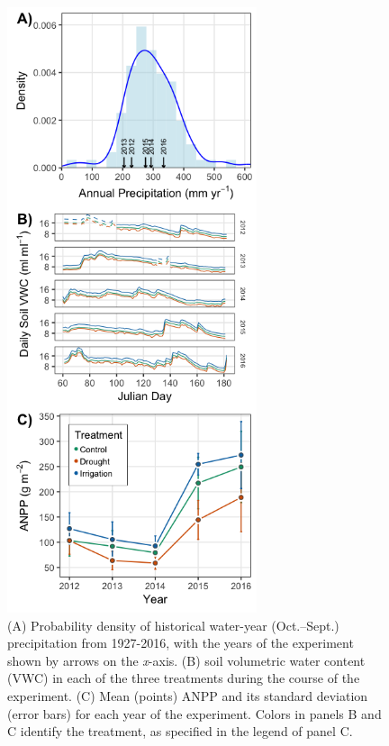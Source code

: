 \documentclass[fleqn,10pt,lineno]{wlpeerj} %
\begin{document}
\begin{figure}[!ht]
  \centering
      \includegraphics[height=7in]{../figures/data_panels.png}
  \caption{(A) Probability density of historical water-year (Oct.--Sept.) precipitation from 1927-2016, with the years of the experiment shown by arrows on the \emph{x}-axis. (B)  soil volumetric water content (VWC) in each of the three treatments during the course of the experiment.  (C) Mean (points) ANPP and its standard deviation (error bars) for each year of the experiment. Colors in panels B and C identify the treatment, as specified in the legend of panel C.}
\end{figure}

\newpage{}
\end{document}
